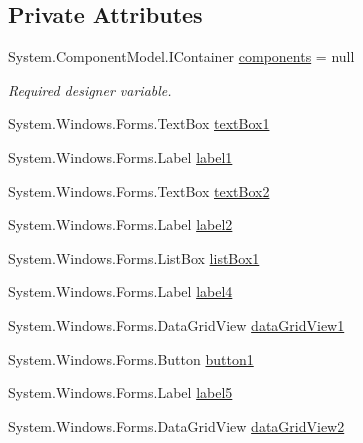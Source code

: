 \subsection*{Private Attributes}
\begin{DoxyCompactItemize}
\item 
System.\+Component\+Model.\+I\+Container \hyperlink{classProject__Codename__Olympia__v1_1_1__0_1_1AthleteForm_aa30cbb394bf094f54d84899c54f36a52}{components} = null
\begin{DoxyCompactList}\small\item\em Required designer variable. \end{DoxyCompactList}\item 
System.\+Windows.\+Forms.\+Text\+Box \hyperlink{classProject__Codename__Olympia__v1_1_1__0_1_1AthleteForm_a2c52ad814a2b11356108438e81351f8e}{text\+Box1}
\item 
System.\+Windows.\+Forms.\+Label \hyperlink{classProject__Codename__Olympia__v1_1_1__0_1_1AthleteForm_a393f7116192ada919d90273d653fad63}{label1}
\item 
System.\+Windows.\+Forms.\+Text\+Box \hyperlink{classProject__Codename__Olympia__v1_1_1__0_1_1AthleteForm_a0880cf44d758bf012c8bac388a2c3533}{text\+Box2}
\item 
System.\+Windows.\+Forms.\+Label \hyperlink{classProject__Codename__Olympia__v1_1_1__0_1_1AthleteForm_a61f8512b417ad8554870aafdfab53930}{label2}
\item 
System.\+Windows.\+Forms.\+List\+Box \hyperlink{classProject__Codename__Olympia__v1_1_1__0_1_1AthleteForm_a00e9e5c02e7af1bd3ac91bc334e3b25c}{list\+Box1}
\item 
System.\+Windows.\+Forms.\+Label \hyperlink{classProject__Codename__Olympia__v1_1_1__0_1_1AthleteForm_ab26862123d101247d500ddcf3b8cb00d}{label4}
\item 
System.\+Windows.\+Forms.\+Data\+Grid\+View \hyperlink{classProject__Codename__Olympia__v1_1_1__0_1_1AthleteForm_a2ead2c58e3f64f1bc541d95427b86b18}{data\+Grid\+View1}
\item 
System.\+Windows.\+Forms.\+Button \hyperlink{classProject__Codename__Olympia__v1_1_1__0_1_1AthleteForm_a8fdc4cf13d9dad9755488bbdce969200}{button1}
\item 
System.\+Windows.\+Forms.\+Label \hyperlink{classProject__Codename__Olympia__v1_1_1__0_1_1AthleteForm_a8115c52f6fb9b842fa363327169a7273}{label5}
\item 
System.\+Windows.\+Forms.\+Data\+Grid\+View \hyperlink{classProject__Codename__Olympia__v1_1_1__0_1_1AthleteForm_ab26e2e2fd0f8b789915509f8cfd3c2b8}{data\+Grid\+View2}

\end{DoxyCompactItemize}

